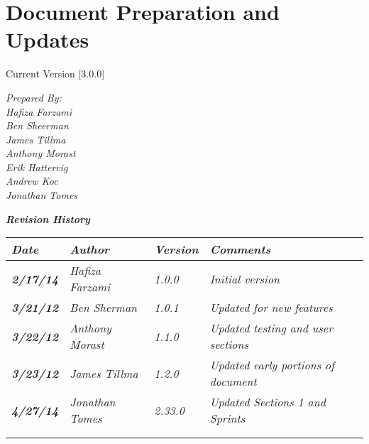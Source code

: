 
\chapter{Document Preparation and Updates}

Current Version [3.0.0]
\vspace*{5mm}

{\color{MSBlue3}
\noindent
\textit{Prepared By:}\\
\textit{Hafiza Farzami}\\
\textit{Ben Sheerman}\\
\textit{James Tillma}\\
\textit{Anthony Morast}\\
\textit{Erik Hattervig}\\
\textit{Andrew Koc}\\
\textit{Jonathan Tomes}\\
}

\vfill
\noindent
{\color{color02} \textit{\textbf{Revision History}}}\\
\begin{tabular}{|>{\raggedright}p{1.5cm}|>{\raggedright}p{3cm}|>{\raggedright}p{1.5cm}|>{\raggedright}p{9cm}|}
\hline
\textit{\textbf{Date}} &  \textit{\textbf{Author}} & \textit{\textbf{Version}} & \textit{\textbf{Comments}}\tabularnewline
\hline
 \textit{\textbf{2/17/14}} & \textit{Hafiza Farzami} & \textit{1.0.0} & \textit{Initial version}\tabularnewline
\hline
\textit{\textbf{3/21/12}} & \textit{Ben Sherman} & \textit{1.0.1} & \textit{Updated for new features}\tabularnewline
\hline
\textit{\textbf{3/22/12}} & \textit{Anthony Morast} & \textit{1.1.0} & \textit{Updated testing and user sections}\tabularnewline
 \hline
\textit{\textbf{3/23/12}} & \textit{James Tillma} & \textit{1.2.0} & \textit{Updated early portions of document}\tabularnewline
\hline
\textit{\textbf{4/27/14}} & \textit{Jonathan Tomes}  &\textit{2.33.0}  & \textit{Updated Sections 1 and Sprints} \tabularnewline
\hline
 &  &  & \tabularnewline
\hline
 &  &  & \tabularnewline
\hline
\end{tabular}
\vfill

